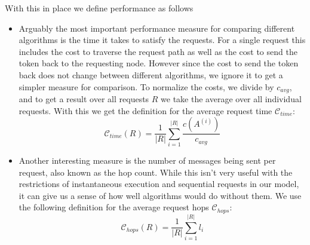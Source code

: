 \documentclass[a4paper, oneside]{discothesis}
\begin{document}
With this in place we define performance as follows
\begin{itemize}
\item
  Arguably the most important performance measure for comparing different algorithms is the time it takes to satisfy the requests. For a single request this includes the cost to traverse the request path as well as the cost to send the token back to the requesting node. However since the cost to send the token back does not change between different algorithms, we ignore it to get a simpler measure for comparison. To normalize the costs, we divide by $c_{avg}$, and to get a result over all requests $R$ we take the average over all individual requests. With this we get the definition for the average request time $\mathcal{C}_{time}$:
  \begin{equation}
    \mathcal{C}_{time}(R) = \frac{1}{|R|}\sum_{i=1}^{|R|}\frac{c(A^{(i)})}{c_{avg}}
  \end{equation}

\item
  Another interesting measure is the number of messages being sent per request, also known as the hop count. While this isn't very useful with the restrictions of instantaneous execution and sequential requests in our model, it can give us a sense of how well algorithms would do without them. We use the following definition for the average request hops $\mathcal{C}_{hops}$:
  \begin{equation}
    \mathcal{C}_{hops}(R) = \frac{1}{|R|}\sum_{i=1}^{|R|}l_i
  \end{equation}
\end{itemize}
\end{document}
